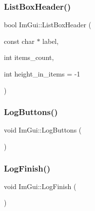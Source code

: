 \hypertarget{namespace_im_gui_a6c5c48e5e5b90365f3f6faaa3307af26}{}\label{namespace_im_gui_a6c5c48e5e5b90365f3f6faaa3307af26} 
\subsubsection{\texorpdfstring{List\+Box\+Header()}{ListBoxHeader()}\hspace{0.1cm}{\footnotesize\ttfamily [2/2]}}
{\footnotesize\ttfamily bool Im\+Gui\+::\+List\+Box\+Header (\begin{DoxyParamCaption}\item[{const char $\ast$}]{label,  }\item[{int}]{items\+\_\+count,  }\item[{int}]{height\+\_\+in\+\_\+items = {\ttfamily -\/1} }\end{DoxyParamCaption})}

\hypertarget{namespace_im_gui_a7bd295da4be19bab98262c76fcaeb4fb}{}\label{namespace_im_gui_a7bd295da4be19bab98262c76fcaeb4fb} 
\subsubsection{\texorpdfstring{Log\+Buttons()}{LogButtons()}}
{\footnotesize\ttfamily void Im\+Gui\+::\+Log\+Buttons (\begin{DoxyParamCaption}{ }\end{DoxyParamCaption})}

\hypertarget{namespace_im_gui_a2ebcd048d1ca025fb972e1c2e920e3f3}{}\label{namespace_im_gui_a2ebcd048d1ca025fb972e1c2e920e3f3} 
\subsubsection{\texorpdfstring{Log\+Finish()}{LogFinish()}}
{\footnotesize\ttfamily void Im\+Gui\+::\+Log\+Finish (\begin{DoxyParamCaption}{ }\end{DoxyParamCaption})}

\hypertarget{namespace_im_gui_aa548475d8f771ab6524d73d900a41198}{}\label{namespace_im_gui_aa548475d8f771ab6524d73d900a41198} 
